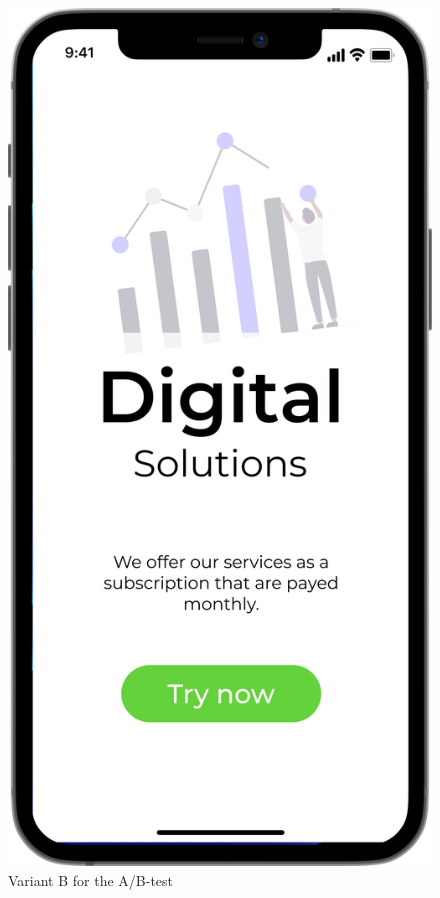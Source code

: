 \begin{figure}[H]
\begin{minipage}[b]{0.45\textwidth}
    \label{fig:images/A}
  \end{minipage}
  \hfill
  \begin{minipage}[b]{0.45\textwidth}
    \includegraphics[width=\linewidth]{images/B.png}
    \caption{Variant B for the A/B-test}
    \label{fig:images/B}
  \end{minipage}
\end{figure}

